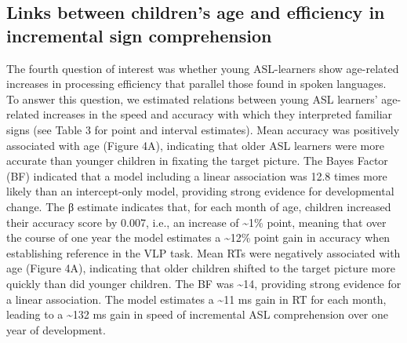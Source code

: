 \documentclass[oneside]{report}
\begin{document}
\hypertarget{links-between-childrens-age-and-efficiency-in-incremental-sign-comprehension}{%
\subsection{Links between children's age and efficiency in incremental
sign
comprehension}\label{links-between-childrens-age-and-efficiency-in-incremental-sign-comprehension}}

The fourth question of interest was whether young ASL-learners show
age-related increases in processing efficiency that parallel those found
in spoken languages. To answer this question, we estimated relations
between young ASL learners' age-related increases in the speed and
accuracy with which they interpreted familiar signs (see Table 3 for
point and interval estimates). Mean accuracy was positively associated
with age (Figure 4A), indicating that older ASL learners were more
accurate than younger children in fixating the target picture. The Bayes
Factor (BF) indicated that a model including a linear association was
12.8 times more likely than an intercept-only model, providing strong
evidence for developmental change. The β estimate indicates that, for
each month of age, children increased their accuracy score by 0.007,
i.e., an increase of \textasciitilde{}1\% point, meaning that over the
course of one year the model estimates a \textasciitilde{}12\% point
gain in accuracy when establishing reference in the VLP task. Mean RTs
were negatively associated with age (Figure 4A), indicating that older
children shifted to the target picture more quickly than did younger
children. The BF was \textasciitilde{}14, providing strong evidence for
a linear association. The model estimates a \textasciitilde{}11 ms gain
in RT for each month, leading to a \textasciitilde{}132 ms gain in speed
of incremental ASL comprehension over one year of development.
\end{document}
